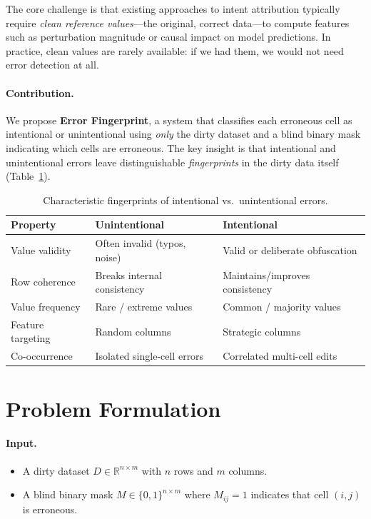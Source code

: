\documentclass[11pt,a4paper]{article}
\begin{document}
The core challenge is that existing approaches to intent attribution typically
require \emph{clean reference values}---the original, correct data---to
compute features such as perturbation magnitude or causal impact on model
predictions.  In practice, clean values are rarely available: if we had them,
we would not need error detection at all.

\paragraph{Contribution.}
We propose \textbf{Error Fingerprint}, a system that classifies each
erroneous cell as intentional or unintentional using \emph{only} the dirty
dataset and a blind binary mask indicating which cells are erroneous.  The
key insight is that intentional and unintentional errors leave
distinguishable \emph{fingerprints} in the dirty data itself (Table~\ref{tab:fingerprints}).

\begin{table}[h]
\centering
\caption{Characteristic fingerprints of intentional vs.\ unintentional errors.}
\label{tab:fingerprints}
\small
\begin{tabular}{@{}lll@{}}
\toprule
\textbf{Property} & \textbf{Unintentional} & \textbf{Intentional} \\
\midrule
Value validity     & Often invalid (typos, noise)       & Valid or deliberate obfuscation \\
Row coherence      & Breaks internal consistency         & Maintains/improves consistency \\
Value frequency    & Rare / extreme values               & Common / majority values \\
Feature targeting  & Random columns                      & Strategic columns \\
Co-occurrence      & Isolated single-cell errors          & Correlated multi-cell edits \\
\bottomrule
\end{tabular}
\end{table}

\section{Problem Formulation}
\label{sec:problem}

\paragraph{Input.}
\begin{itemize}[nosep]
  \item A dirty dataset $D \in \mathbb{R}^{n \times m}$ with $n$ rows and $m$ columns.
  \item A blind binary mask $M \in \{0,1\}^{n \times m}$ where $M_{ij} = 1$
        indicates that cell $(i,j)$ is erroneous.
\end{itemize}
\end{document}
